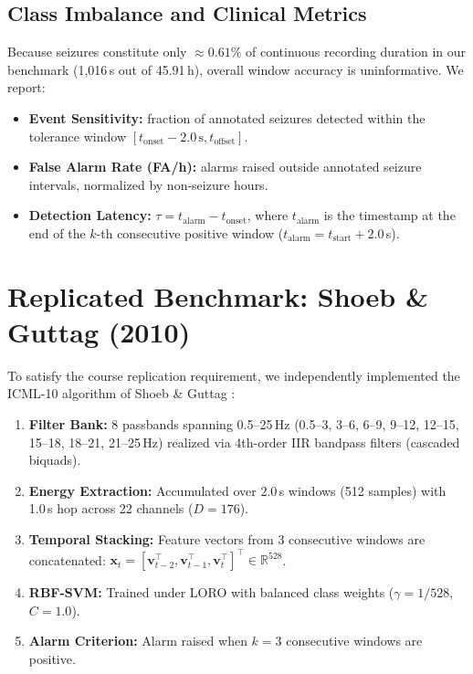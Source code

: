 \documentclass[10pt,twocolumn,letterpaper]{article}
\begin{document}
\subsection{Class Imbalance and Clinical Metrics}

Because seizures constitute only $\approx 0.61\%$ of continuous recording duration in our benchmark (1,016\,s out of 45.91\,h), overall window accuracy is uninformative. We report:
\begin{itemize}
  \item \textbf{Event Sensitivity:} fraction of annotated seizures detected within the tolerance window $[t_{\text{onset}} - 2.0\,\text{s}, t_{\text{offset}}]$.
  \item \textbf{False Alarm Rate (FA/h):} alarms raised outside annotated seizure intervals, normalized by non-seizure hours.
  \item \textbf{Detection Latency:} $\tau = t_{\text{alarm}} - t_{\text{onset}}$, where $t_{\text{alarm}}$ is the timestamp at the end of the $k$-th consecutive positive window ($t_{\text{alarm}} = t_{\text{start}} + 2.0$\,s).
\end{itemize}

\section{Replicated Benchmark: Shoeb \& Guttag (2010)}
\label{sec:replication}

To satisfy the course replication requirement, we independently implemented the ICML-10 algorithm of Shoeb \& Guttag \cite{shoeb2010icml}:
\begin{enumerate}
    \item \textbf{Filter Bank:} 8 passbands spanning 0.5--25\,Hz (0.5--3, 3--6, 6--9, 9--12, 12--15, 15--18, 18--21, 21--25\,Hz) realized via 4th-order IIR bandpass filters (cascaded biquads).
    \item \textbf{Energy Extraction:} Accumulated over 2.0\,s windows (512 samples) with 1.0\,s hop across 22 channels ($D=176$).
    \item \textbf{Temporal Stacking:} Feature vectors from 3 consecutive windows are concatenated: $\mathbf{x}_t = [\mathbf{v}_{t-2}^\top, \mathbf{v}_{t-1}^\top, \mathbf{v}_t^\top]^\top \in \mathbb{R}^{528}$.
    \item \textbf{RBF-SVM:} Trained under LORO with balanced class weights ($\gamma = 1/528$, $C=1.0$).
    \item \textbf{Alarm Criterion:} Alarm raised when $k=3$ consecutive windows are positive.
\end{enumerate}
\end{document}
